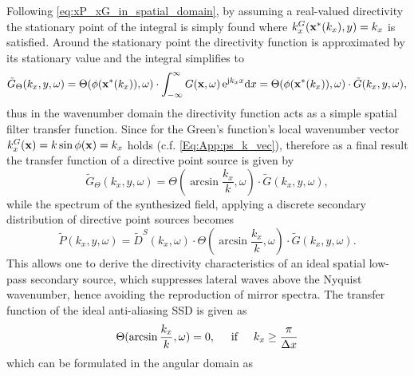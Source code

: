 Following \eqref{eq:xP_xG_in_spatial_domain}, by assuming a real-valued directivity the stationary point of the integral is simply found where $k_x^{G}(\mathbf{x}^*(k_x),y) = k_x$ is satisfied.
Around the stationary point the directivity function is approximated by its stationary value and the integral simplifies to
\begin{equation}
\tilde{G}_{\Theta}(k_x,y,\omega) = \Theta(\phi(\mathbf{x}^*(k_x)),\omega) \cdot \int_{-\infty}^{\infty} 
G(\mathbf{x},\omega) \, \mathrm{e}^{\mathrm{j} k_x x} \mathrm{d} x =
\Theta(\phi(\mathbf{x}^*(k_x)),\omega) \cdot 
\tilde{G}(k_x,y,\omega),
\end{equation}
thus in the wavenumber domain the directivity function acts as a simple spatial filter transfer function.
Since for the Green's function's local wavenumber vector $k_x^{G}(\mathbf{x}) = k \sin \phi(\mathbf{x}) = k_x$ holds (c.f. \eqref{Eq:App:ps_k_vec}), therefore as a final result the transfer function of a directive point source is given by
\begin{equation}
\tilde{G}_{\Theta}(k_x,y,\omega) = 
\Theta(\arcsin \frac{k_x}{k},\omega) \cdot 
\tilde{G}(k_x,y,\omega),
\end{equation}
while the spectrum of the synthesized field, applying a discrete secondary distribution of directive point sources becomes
\begin{equation}
\tilde{P}(k_x,y,\omega) = \tilde{D}^S(k_x,\omega) \cdot \Theta(\arcsin \frac{k_x}{k},\omega) \cdot \tilde{G}(k_x,y,\omega).
\end{equation}
This allows one to derive the directivity characteristics of an ideal spatial low-pass secondary source, which suppresses lateral waves above the Nyquist wavenumber, hence avoiding the reproduction of mirror spectra.
The transfer function of the ideal anti-aliasing SSD is given as
\begin{equation}
\Theta(\arcsin \frac{k_x}{k},\omega) = 0, \hspace{5mm} \text{if} \hspace{5mm} k_x \geq \frac{\pi}{\Delta x}
\end{equation}
which can be formulated in the angular domain as
